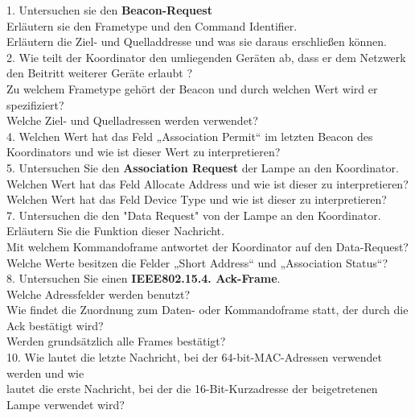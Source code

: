 \begin{Fragen}
    1. Untersuchen sie den \textbf{Beacon-Request}\\
    Erläutern sie den Frametype und den Command Identifier.\\ 
    Erläutern die Ziel- und Quelladdresse und was sie daraus erschließen können.\\
    
    2. Wie teilt der Koordinator den umliegenden Geräten ab, dass er dem Netzwerk den Beitritt weiterer Geräte erlaubt ?\\
    Zu welchem Frametype gehört der Beacon und durch welchen Wert wird er spezifiziert?\\
    Welche Ziel- und Quelladressen werden verwendet?\\
    
    4. Welchen Wert hat das Feld „Association Permit“ im letzten Beacon des Koordinators und wie ist dieser Wert zu interpretieren? \\
    
    5. Untersuchen Sie den \textbf{Association Request} der Lampe an den Koordinator. \\
    Welchen Wert hat das Feld \grqq Allocate Address \grqq{} und wie ist dieser zu interpretieren?\\
    Welchen Wert hat das Feld \grqq Device Type\grqq{} und wie ist dieser zu interpretieren?\\
    
    7. Untersuchen die den "Data Request" von der Lampe an den Koordinator.\\
    Erläutern Sie die Funktion dieser Nachricht.\\
    Mit welchem Kommandoframe antwortet der Koordinator auf den Data-Request?\\
    Welche Werte besitzen die Felder „Short Address“ und „Association Status“?\\
    
    8. Untersuchen Sie einen \textbf{IEEE802.15.4. Ack-Frame}.\\
    Welche Adressfelder werden benutzt? \\
    Wie findet die Zuordnung zum Daten- oder Kommandoframe statt, der durch die Ack bestätigt wird? \\
    Werden grundsätzlich alle Frames bestätigt?\\
    
    10. Wie lautet die letzte Nachricht, bei der 64-bit-MAC-Adressen verwendet werden und wie\\
     lautet die erste Nachricht, bei der die 16-Bit-Kurzadresse der beigetretenen Lampe verwendet wird?\\
    

\end{Fragen}
